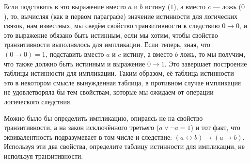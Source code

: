 Если подставить в это выражение вместо $a$ и $b$ истину ($1$), а вместо $c$ --- ложь ($0$), то, вычисляя (как в первом параграфе) значение истинности для логических связок, нам известных, мы сведём свойство транзитивности к следствию $0 \to 0$, и это выражение обязано быть истинным, если мы хотим, чтобы свойство транзитивности выполнялось для импликации. Если теперь, зная, что $(0 \to 0) = 1$, подставить вместо $a$ и $c$ истину, а вместо $b$ ложь, то мы получим, что также должно быть истинным и выражение $0 \to 1$. Это завершает построение таблицы истинности для импликации. Таким образом, её таблица истинности --- это в некотором смысле вынужденная таблица, в противном случае импликация не удовлетворяла бы тем свойствам, которые мы ожидаем от операции логического следствия.

\begin{exercise}Можно было бы определить импликацию, опираясь не на свойство транзитивности, а на закон исключённого третьего ($a \lor \neg a = 1$) и тот факт, что эквивалентность подразумевает в том числе и следствие: $(a \leftrightarrow b) \to (a \to b)$. Используя эти два свойства, определите таблицу истинности для импликации, не используя транзитивности.\end{exercise}
